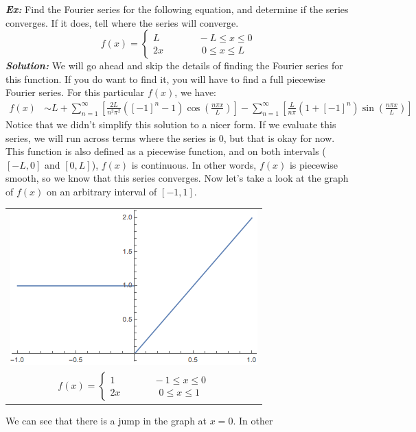 \noindent\textbf{\textit{Ex:}} Find the Fourier series for the following
equation, and determine if the series converges. If it does, tell where the
series will converge.
\[ f(x) =
\begin{cases}
L \qquad\qquad -L \leq x \leq 0\\
2x \qquad\qquad 0 \leq x \leq L
\end{cases}
\]
\indent\textbf{\textit{Solution:}} We will go ahead and skip the details of
finding the Fourier series for this function. If you do want to find it, you
will have to find a full piecewise Fourier series. For this particular $f(x)$,
we have:
\begin{align*}
f(x) &\sim L + \sum_{n=1}^{\infty}\left[\frac{2L}{n^{2}\pi^{2}}([-1]^{n}-1)\cos{\left(\frac{n\pi
x}{L}\right)}\right] - \sum_{n=1}^{\infty}\left[\frac{L}{n\pi}(1 + [-1]^{n})\sin{\left(\frac{n\pi
x}{L}\right)}\right]
\end{align*}
\noindent Notice that we didn't simplify this solution to a nicer form.
If we evaluate this series, we will run across terms where the series is 0, but
that is okay for now. This function is also defined as a piecewise function,
and on both intervals ($[-L,0]$ and $[0,L]$), $f(x)$ is continuous. In other
words, $f(x)$ is piecewise smooth, so we know that this series converges. Now
let's take a look at the graph of $f(x)$ on an arbitrary interval of $[-1,1]$.
\begin{center}
\begin{tabular}{c}
\includegraphics[scale=0.6]{pw_graph_01}\\
$
f(x) =
\begin{cases}
1 \qquad\qquad -1 \leq x \leq 0\\
2x \qquad\qquad 0 \leq x \leq 1
\end{cases}
$
\end{tabular}
\end{center}
\noindent We can see that there is a jump in the graph at $x = 0$. In other
